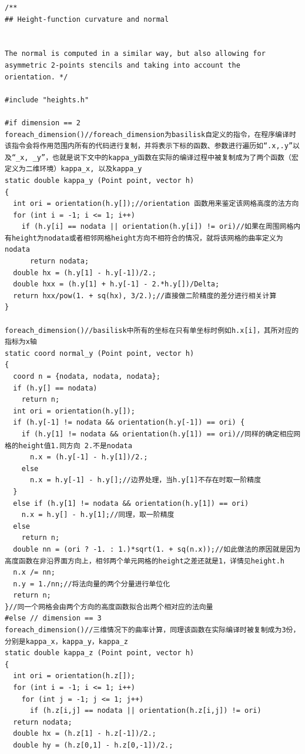 \documentclass[lang=cn,11pt,a4paper]{elegantpaper}
\begin{document}
\begin{verbatim}
/**
## Height-function curvature and normal


The normal is computed in a similar way, but also allowing for
asymmetric 2-points stencils and taking into account the
orientation. */

#include "heights.h"

#if dimension == 2
foreach_dimension()//foreach_dimension为basilisk自定义的指令，在程序编译时该指令会将作用范围内所有的代码进行复制，并将表示下标的函数、参数进行遍历如“.x,.y”以及“_x, _y”，也就是说下文中的kappa_y函数在实际的编译过程中被复制成为了两个函数（宏定义为二维环境）kappa_x, 以及kappa_y
static double kappa_y (Point point, vector h)
{
  int ori = orientation(h.y[]);//orientation 函数用来鉴定该网格高度的法方向
  for (int i = -1; i <= 1; i++)
    if (h.y[i] == nodata || orientation(h.y[i]) != ori)//如果在周围网格内有height为nodata或者相邻网格height方向不相符合的情况，就将该网格的曲率定义为nodata
      return nodata;
  double hx = (h.y[1] - h.y[-1])/2.;
  double hxx = (h.y[1] + h.y[-1] - 2.*h.y[])/Delta;
  return hxx/pow(1. + sq(hx), 3/2.);//直接做二阶精度的差分进行相关计算
}

foreach_dimension()//basilisk中所有的坐标在只有单坐标时例如h.x[i]，其所对应的指标为x轴
static coord normal_y (Point point, vector h)
{
  coord n = {nodata, nodata, nodata};
  if (h.y[] == nodata)
    return n;
  int ori = orientation(h.y[]);
  if (h.y[-1] != nodata && orientation(h.y[-1]) == ori) {
    if (h.y[1] != nodata && orientation(h.y[1]) == ori)//同样的确定相应网格的height值1.同方向 2.不是nodata
      n.x = (h.y[-1] - h.y[1])/2.;
    else
      n.x = h.y[-1] - h.y[];//边界处理，当h.y[1]不存在时取一阶精度
  }
  else if (h.y[1] != nodata && orientation(h.y[1]) == ori)
    n.x = h.y[] - h.y[1];//同理，取一阶精度
  else
    return n;
  double nn = (ori ? -1. : 1.)*sqrt(1. + sq(n.x));//如此做法的原因就是因为高度函数在非沿界面方向上，相邻两个单元网格的height之差还就是1，详情见height.h
  n.x /= nn;
  n.y = 1./nn;//将法向量的两个分量进行单位化
  return n;
}//同一个网格会由两个方向的高度函数拟合出两个相对应的法向量
#else // dimension == 3
foreach_dimension()//三维情况下的曲率计算，同理该函数在实际编译时被复制成为3份，分别是kappa_x，kappa_y，kappa_z
static double kappa_z (Point point, vector h)
{
  int ori = orientation(h.z[]);
  for (int i = -1; i <= 1; i++)
    for (int j = -1; j <= 1; j++)
      if (h.z[i,j] == nodata || orientation(h.z[i,j]) != ori)
  return nodata;
  double hx = (h.z[1] - h.z[-1])/2.;
  double hy = (h.z[0,1] - h.z[0,-1])/2.;


\end{verbatim}
\end{document}

